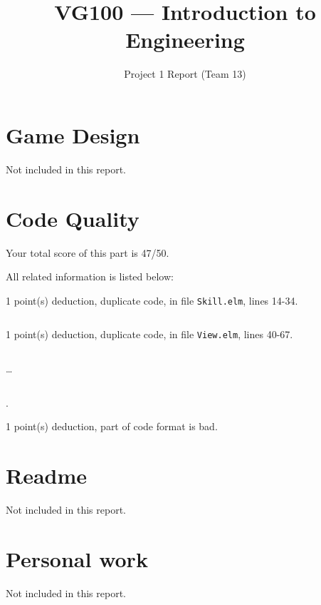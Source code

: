 \documentclass{article}
\title{VG100 --- Introduction to\\ Engineering}
\subtitle{Project 1 Report (Team 13)}
\begin{document}
\maketitle

\section{Game Design}

Not included in this report.

\section{Code Quality}

Your total score of this part is 47/50. \medskip

All related information is listed below: \medskip

1 point(s) {\color{red}deduction}, duplicate code, in file {\color{blue}\texttt{Skill.elm}}, lines {\color{blue}14-34}.

\inputminted[firstline=14,lastline=34]{elm}{Skill.elm}

1 point(s) {\color{red}deduction}, duplicate code, in file {\color{blue}\texttt{View.elm}}, lines {\color{blue}40-67}.

\inputminted[firstline=40,lastline=49]{elm}{View.elm}

\dots

\inputminted[firstline=58,lastline=67]{elm}{View.elm}

.\medskip

1 point(s) {\color{red}deduction}, part of code format is bad.\medskip



\newpage

\section{Readme}

Not included in this report.

\section{Personal work}

Not included in this report.


\newpage
\end{document}
